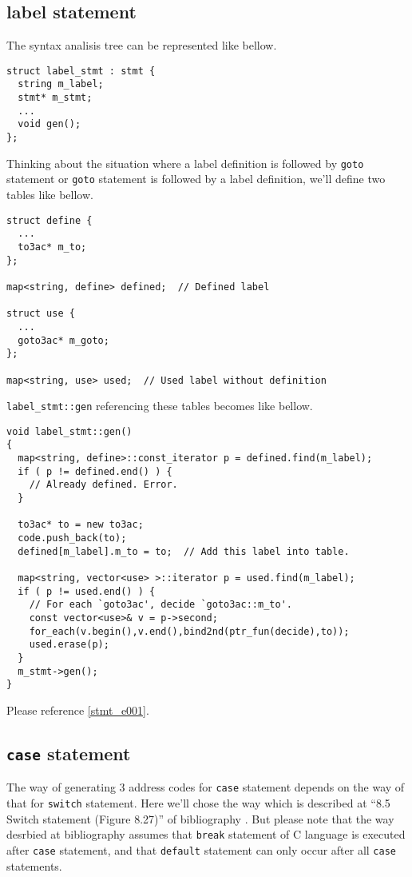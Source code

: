 \subsection{label statement}
\label{stmt_e000}
The syntax analisis tree can be represented like bellow.
\begin{verbatim}
struct label_stmt : stmt {
  string m_label;
  stmt* m_stmt;
  ...
  void gen();
};
\end{verbatim}
Thinking about the situation where
a label definition is followed by {\tt{goto}} statement or
{\tt{goto}} statement is followed by a label definition,
we'll define two tables like bellow.
\begin{verbatim}
struct define {
  ...
  to3ac* m_to;
};

map<string, define> defined;  // Defined label

struct use {
  ...
  goto3ac* m_goto;
};

map<string, use> used;  // Used label without definition
\end{verbatim}
{\tt{label\_stmt::gen}} referencing these tables
becomes like bellow.
\begin{verbatim}
void label_stmt::gen()
{
  map<string, define>::const_iterator p = defined.find(m_label);
  if ( p != defined.end() ) {
    // Already defined. Error.
  }

  to3ac* to = new to3ac;
  code.push_back(to);
  defined[m_label].m_to = to;  // Add this label into table.

  map<string, vector<use> >::iterator p = used.find(m_label);
  if ( p != used.end() ) {
    // For each `goto3ac', decide `goto3ac::m_to'.
    const vector<use>& v = p->second;
    for_each(v.begin(),v.end(),bind2nd(ptr_fun(decide),to));
    used.erase(p);
  }
  m_stmt->gen();
}
\end{verbatim}
Please reference \ref{stmt_e001}.

\subsection{{\tt{case}} statement}
\label{stmt_e002}
The way of generating 3 address codes for {\tt{case}} statement
depends on the way of that for {\tt{switch}} statement.
Here we'll chose the way which is described at ``8.5 Switch statement
(Figure 8.27)'' of bibliography \cite{doragon}.
But please note that the way desrbied at bibliography \cite{doragon}
assumes that
{\tt{break}} statement of C language is executed after {\tt{case}} statement,
and that {\tt{default}} statement can only occur
after all {\tt{case}} statements.

